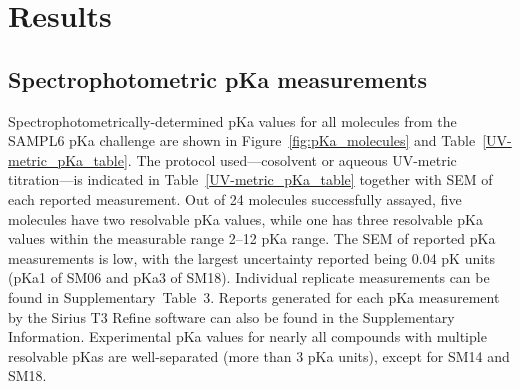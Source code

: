 \documentclass[9pt,lineno]{elife}
\begin{document}
\section{Results}

\subsection{Spectrophotometric pKa measurements}
Spectrophotometrically-determined pKa values for all molecules from the SAMPL6 pKa challenge are shown in Figure~\ref{fig:pKa_molecules} and Table~\ref{UV-metric_pKa_table}. 
The protocol used---cosolvent or aqueous UV-metric titration---is indicated in Table~\ref{UV-metric_pKa_table} together with SEM of each reported measurement. 
Out of 24 molecules successfully assayed, five molecules have two resolvable pKa values, while one has three resolvable pKa values within the measurable range 2--12 pKa range. 
The SEM of reported pKa measurements is low, with the largest uncertainty reported being 0.04 pK units (pKa1 of SM06 and pKa3 of SM18). 
Individual replicate measurements can be found in Supplementary~Table~3. 
Reports generated for each pKa measurement by the Sirius T3 Refine software can also be found in the Supplementary Information. 
Experimental pKa values for nearly all compounds with multiple resolvable pKas are well-separated (more than 3 pKa units), except for SM14 and SM18.
\end{document}
